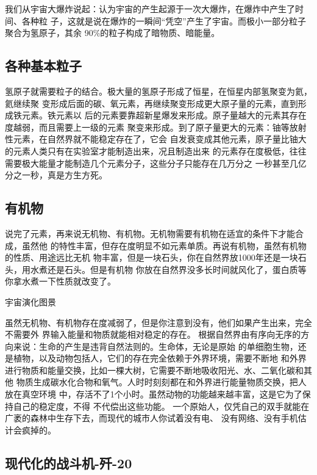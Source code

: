 \documentclass[11pt]{ctexart}
\begin{document}
{{{{我们从宇宙大爆炸说起：认为宇宙的产生起源于一次大爆炸，在爆炸中产生了时间、各种粒
子，这就是说在爆炸的一瞬间“凭空”产生了宇宙。而极小一部分粒子聚合为氢原子，其余
90\%的粒子构成了暗物质、暗能量。

\subsection{各种基本粒子}
\label{sec:orgba24657}

氢原子就需要粒子的结合。极大量的氢原子形成了恒星，在恒星内部氢聚变为氦，氦继续聚
变形成后面的碳、氧元素，再继续聚变形成更大原子量的元素，直到形成铁元素。铁元素以
后的元素要靠超新星爆发来形成。原子量越大的元素其存在度越弱，而且需要上一级的元素
聚变来形成。到了原子量更大的元素：铀等放射性元素，在自然界就不能稳定存在了，它会
自发衰变成其他元素，原子量比铀大的元素人类只有在实验室才能制造出来，况且制造出来
的元素存在度极低，往往需要极大能量才能制造几个元素分子，这些分子只能存在几万分之
一秒甚至几亿分之一秒，真是方生方死。

\subsection{有机物}
\label{sec:org7b64061}

说完了元素，再来说无机物、有机物。无机物需要有机物在适宜的条件下才能合成，虽然他
的特性丰富，但存在度明显不如元素单质。再说有机物，虽然有机物的性质、用途远比无机
物丰富，但是一块石头，你在自然界放1000年还是一块石头，用水煮还是石头。但是有机物
你放在自然界没多长时间就风化了，蛋白质等你拿水煮一下性质就改变了。

宇宙演化图景

虽然无机物、有机物存在度减弱了，但是你注意到没有，他们如果产生出来，完全不需要外
界输入能量和物质就能相对稳定的存在。
根据自然界由有序向无序的方向来说：生命的产生是违背自然法则的。生命体，无论是原始
的单细胞生物，还是植物，以及动物包括人，它们的存在完全依赖于外界环境，需要不断地
和外界进行物质和能量交换，比如一棵大树，它需要不断地吸收阳光、水、二氧化碳和其他
物质生成碳水化合物和氧气。人时时刻刻都在和外界进行能量物质交换，把人放在真空环境
中，存活不了1个小时。虽然动物的功能越来越丰富，这是它为了保持自己的稳定度，不得
不代偿出这些功能。
一个原始人，仅凭自己的双手就能在广袤的森林中生存下去，而现代的城市人你试着没有电、
没有网络、没有手机估计会疯掉的。


\subsection{现代化的战斗机-歼-20}
\label{sec:orge06290d}
}}}}
\end{document}
